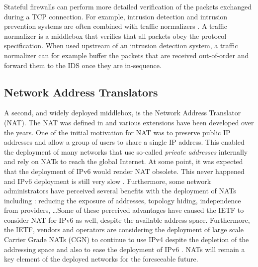 Stateful firewalls can perform more detailed verification of the packets exchanged during a TCP connection. For example, intrusion detection and intrusion prevention systems are often combined with traffic normalizers \cite{Vutukuru_TCP:2008,handley2001network}. A traffic normalizer is a middlebox that verifies that all packets obey the protocol specification. When used upstream of an intrusion detection system, a traffic normalizer can for example buffer the packets that are received out-of-order and forward them to the IDS once they are in-sequence.

\subsection{Network Address Translators}

A second, and widely deployed middlebox, is the Network Address Translator (NAT). The NAT was defined in \cite{rfc1631} and various extensions have been developed over the years. One of the initial motivation for NAT was to preserve public IP addresses and allow a group of users to share a single IP address. This enabled the deployment of many networks that use so-called \emph{private addresses} \cite{rfc1918} internally and rely on NATs to reach the global Internet. At some point, it was expected that the deployment of IPv6 would render NAT obsolete. This never happened and IPv6 deployment is still very slow \cite{Dhamdhere_IPv6:2012}. Furthermore, some network administrators have perceived several benefits with the deployment of NATs \cite{rfc2993} including : reducing the exposure of addresses, topology hiding, independence from providers, \ldots Some of these perceived advantages have caused the IETF to consider NAT for IPv6 as well, despite the available address space. Furthermore, the IETF, vendors and operators are considering the deployment of large scale Carrier Grade NATs (CGN) to continue to use IPv4 despite the depletion of the addressing space \cite{Perreault_CGN:2012} and also to ease the deployment of IPv6 \cite{rfc6264}. NATs will remain a key element of the deployed networks for the foreseeable future. 

